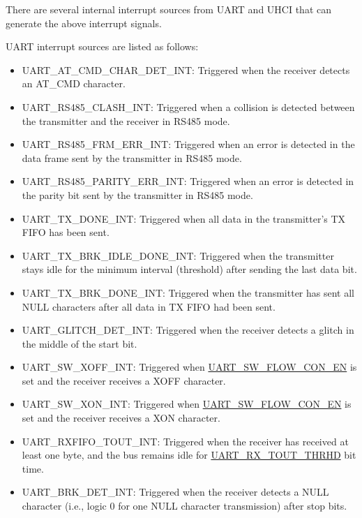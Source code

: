 \documentclass[main\_\_EN.tex]{subfiles}
\begin{document}
There are several internal interrupt sources from UART and UHCI that can generate the above interrupt signals.

UART interrupt sources are listed as follows:

\begin{itemize}
\item \label{int:UARTATCMDCHARDETINT}UART\_AT\_CMD\_CHAR\_DET\_INT: Triggered when the receiver detects an AT\_CMD character.
\item \label{int:UARTRS485CLASHINT}UART\_RS485\_CLASH\_INT: Triggered when a collision is detected between the transmitter and the receiver in RS485 mode.
\item \label{int:UARTRS485FRMERRINT}UART\_RS485\_FRM\_ERR\_INT: Triggered when an error is detected in the data frame sent by the transmitter in RS485 mode.
\item \label{int:UARTRS485PARITYERRINT}UART\_RS485\_PARITY\_ERR\_INT: Triggered when an error is detected in the parity bit sent by the transmitter in RS485 mode.
\item \label{int:UARTTXDONEINT}UART\_TX\_DONE\_INT: Triggered when all data in the transmitter's TX FIFO has been sent.
\item \label{int:UARTTXBRKIDLEDONEINT}UART\_TX\_BRK\_IDLE\_DONE\_INT: Triggered when the transmitter stays idle for the minimum interval (threshold) after sending the last data bit.
\item \label{int:UARTTXBRKDONEINT}UART\_TX\_BRK\_DONE\_INT: Triggered when the transmitter has sent all NULL characters after all data in TX FIFO had been sent.
\item \label{int:UARTGLITCHDETINT}UART\_GLITCH\_DET\_INT: Triggered when the receiver detects a glitch in the middle of the start bit.
\item \label{int:UARTSWXOFFINT}UART\_SW\_XOFF\_INT: Triggered when \hyperref[fielddesc:UARTSWFLOWCONEN]{UART\_SW\_FLOW\_CON\_EN} is set and the receiver receives a XOFF character.
\item \label{int:UARTSWXONINT}UART\_SW\_XON\_INT: Triggered when \hyperref[fielddesc:UARTSWFLOWCONEN]{UART\_SW\_FLOW\_CON\_EN} is set and the receiver receives a XON character.
\item \label{int:UARTRXFIFOTOUTINT}UART\_RXFIFO\_TOUT\_INT: Triggered when the receiver has received at least one byte, and the bus remains idle for \hyperref[fielddesc:UARTRXTOUTTHRHD]{UART\_RX\_TOUT\_THRHD} bit time.
\item \label{int:UARTBRKDETINT}UART\_BRK\_DET\_INT: Triggered when the receiver detects a NULL character (i.e., logic 0 for one NULL character transmission) after stop bits.

\end{itemize}
\end{document}
